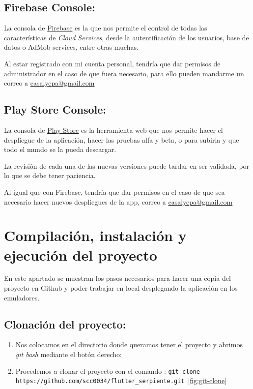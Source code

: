\subsection{Firebase Console:}
La consola de \href{https://console.firebase.google.com/?hl=es}{Firebase} es la que nos permite el control de todas las características de \emph{Cloud Services}, desde la autentificación de los usuarios, base de datos o AdMob services, entre otras muchas.

Al estar registrado con mi cuenta personal, tendría que dar permisos de administrador en el caso de que fuera necesario, para ello pueden mandarme un correo a \href{mailto:casalyepa@gmail.com}{casalyepa@gmail.com}


\subsection{Play Store Console:}
La consola de \href{https://play.google.com/apps}{Play Store} es la herramienta web que nos permite hacer el despliegue de la aplicación, hacer las pruebas alfa y beta, o para subirla y que todo el mundo se la pueda descargar.

La revisión de cada una de las nuevas versiones puede tardar en ser validada, por lo que se debe tener paciencia.

Al igual que con Firebase, tendría que dar permisos en el caso de que sea necesario hacer nuevos despliegues de la app, correo a \href{mailto:casalyepa@gmail.com}{casalyepa@gmail.com}


\section{Compilación, instalación y ejecución del proyecto}
En este apartado se muestran los pasos necesarios para hacer una copia del proyecto en Github y poder trabajar en local desplegando la aplicación en los emuladores.

\subsection{Clonación del proyecto:}

\begin{enumerate}
	\item Nos colocamos en el directorio donde queramos tener el proyecto y abrimos \emph{git bash} mediante el botón derecho:
	\item Procedemos a clonar el proyecto con el comando : 
	\texttt{git clone \\https://github.com/scc0034/flutter\_serpiente.git}~\ref{fig:git-clone}
\end{enumerate}

